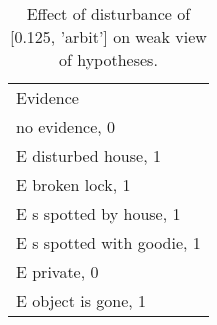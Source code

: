 \begin{table}\begin{tabular}{l}\toprule\multirow{2}{*}{Evidence} \\\\\midrule
no evidence, 0 & \\E disturbed house, 1 & \\E broken lock, 1 & \\E s spotted by house, 1 & \\E s spotted with goodie, 1 & \\E private, 0 & \\E object is gone, 1 & \\\bottomrule\end{tabular}\caption{Effect of disturbance of [0.125, 'arbit'] on weak view of hypotheses.}\end{table}